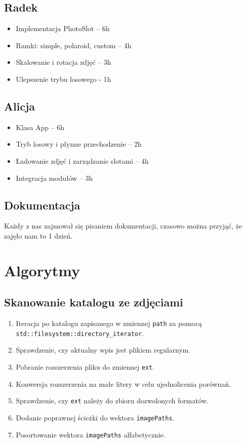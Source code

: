 \documentclass[12pt]{article}
\begin{document}
\subsection*{Radek}
\begin{itemize}
    \item Implementacja PhotoSlot – 6h
    \item Ramki: simple, polaroid, custom – 4h
    \item Skalowanie i rotacja zdjęć – 3h
    \item Ulepszenie trybu losowego - 1h
\end{itemize}

\subsection*{Alicja}
\begin{itemize}
    \item Klasa App – 6h
    \item Tryb losowy i płynne przechodzenie – 2h
    \item Ładowanie zdjęć i zarządzanie slotami – 4h
    \item Integracja modułów – 3h
\end{itemize}

\subsection*{Dokumentacja}
Każdy z nas zajmował się pisaniem dokumentacji, czasowo można przyjąć, że zajęło nam to 1 dzień.

\section{Algorytmy}
\subsection{Skanowanie katalogu ze zdjęciami}
\begin{enumerate}
    \item Iteracja po katalogu zapisanego w zmiennej \texttt{path} za pomocą \texttt{std::filesystem::directory\_iterator}.
    \item Sprawdzenie, czy aktualny wpis jest plikiem regularnym.
    \item Pobranie rozszerzenia pliku do zmiennej \texttt{ext}.
    \item Konwersja rozszerzenia na małe litery w celu ujednolicenia porównań.
    \item Sprawdzenie, czy \texttt{ext} należy do zbioru dozwolonych formatów.
    \item Dodanie poprawnej ścieżki do wektora \texttt{imagePaths}.
    \item Posortowanie wektora \texttt{imagePaths} alfabetycznie.
\end{enumerate}
\end{document}
